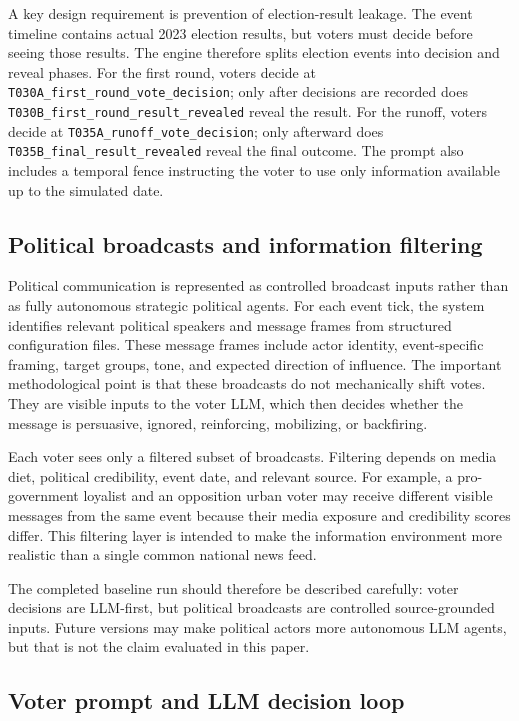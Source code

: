 \documentclass[pdflatex,sn-mathphys-num,iicol]{sn-jnl}
\begin{document}
A key design requirement is prevention of election-result leakage. The event
timeline contains actual 2023 election results, but voters must decide before
seeing those results. The engine therefore splits election events into decision
and reveal phases. For the first round, voters decide at
\texttt{T030A\_first\_round\_vote\_decision}; only after decisions are recorded
does \texttt{T030B\_first\_round\_result\_revealed} reveal the result. For the
runoff, voters decide at \texttt{T035A\_runoff\_vote\_decision}; only afterward
does \texttt{T035B\_final\_result\_revealed} reveal the final outcome. The
prompt also includes a temporal fence instructing the voter to use only
information available up to the simulated date.

\subsection{Political broadcasts and information
filtering}\label{subsec:broadcasts}

Political communication is represented as controlled broadcast inputs rather
than as fully autonomous strategic political agents. For each event tick, the
system identifies relevant political speakers and message frames from structured
configuration files. These message frames include actor identity, event-specific
framing, target groups, tone, and expected direction of influence. The important
methodological point is that these broadcasts do not mechanically shift votes.
They are visible inputs to the voter LLM, which then decides whether the message
is persuasive, ignored, reinforcing, mobilizing, or backfiring.

Each voter sees only a filtered subset of broadcasts. Filtering depends on media
diet, political credibility, event date, and relevant source. For example, a
pro-government loyalist and an opposition urban voter may receive different
visible messages from the same event because their media exposure and credibility
scores differ. This filtering layer is intended to make the information
environment more realistic than a single common national news feed.

The completed baseline run should therefore be described carefully: voter
decisions are LLM-first, but political broadcasts are controlled source-grounded
inputs. Future versions may make political actors more autonomous LLM agents,
but that is not the claim evaluated in this paper.

\subsection{Voter prompt and LLM decision loop}\label{subsec:prompt}
\end{document}
